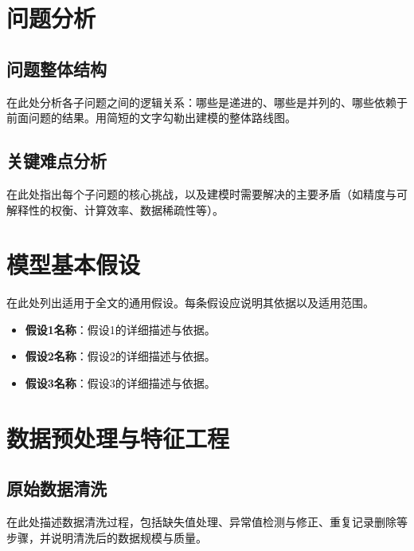 \documentclass[12pt,a4paper]{article}
\begin{document}
\section{问题分析}

\subsection{问题整体结构}

在此处分析各子问题之间的逻辑关系：哪些是递进的、哪些是并列的、哪些依赖于前面问题的结果。用简短的文字勾勒出建模的整体路线图。

\subsection{关键难点分析}

在此处指出每个子问题的核心挑战，以及建模时需要解决的主要矛盾（如精度与可解释性的权衡、计算效率、数据稀疏性等）。

\section{模型基本假设}

在此处列出适用于全文的通用假设。每条假设应说明其依据以及适用范围。

\begin{itemize}
    \item \textbf{假设1名称}：假设1的详细描述与依据。
    \item \textbf{假设2名称}：假设2的详细描述与依据。
    \item \textbf{假设3名称}：假设3的详细描述与依据。
\end{itemize}

\section{数据预处理与特征工程}

\subsection{原始数据清洗}

在此处描述数据清洗过程，包括缺失值处理、异常值检测与修正、重复记录删除等步骤，并说明清洗后的数据规模与质量。
\end{document}
